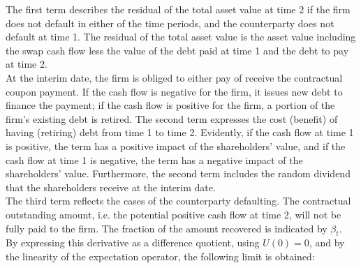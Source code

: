 \documentclass[main.tex]{subfiles}
\begin{document}
        The first term describes the residual of the total asset value at time 2 if the firm does not default in either of the time periods, and the counterparty does not default at time 1.
        The residual of the total asset value is the asset value including the swap cash flow less the value of the debt paid at time 1 and the debt to pay at time 2.
        \\
        At the interim date, the firm is obliged to either pay of receive the contractual coupon payment.
        If the cash flow is negative for the firm, it issues new debt to finance the payment;
        if the cash flow is positive for the firm, a portion of the firm's existing debt is retired.
        The second term expresses the cost (benefit) of having (retiring) debt from time 1 to time 2.
        Evidently, if the cash flow at time 1 is positive, the term has a positive impact of the shareholders' value,
        and if the cash flow at time 1 is negative, the term has a negative impact of the shareholders' value.
        Furthermore, the second term includes the random dividend that the shareholders receive at the interim date.
        \\
        The third term reflects the cases of the counterparty defaulting.
        The contractual outstanding amount, i.e. the potential positive cash flow at time 2, will not be fully paid to the firm.
        The fraction of the amount recovered is indicated by $\beta_{t}$.
        \\
        By expressing this derivative as a difference quotient, using $U(0)=0$,
        and by the linearity of the expectation operator,
        the following limit is obtained:
\end{document}

